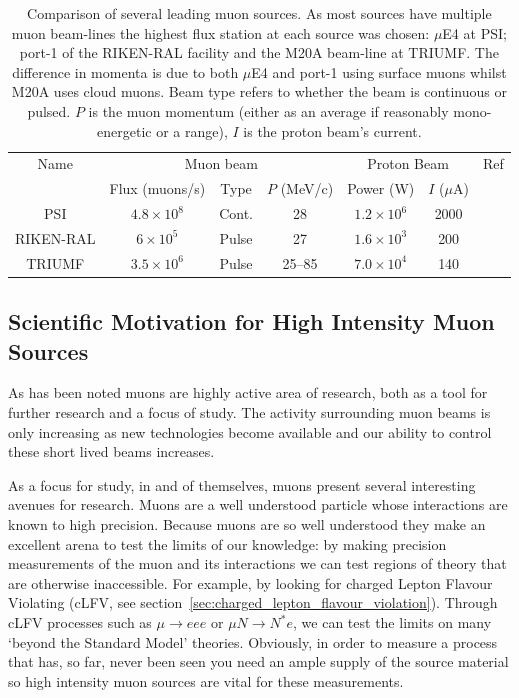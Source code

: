 \begin{table}[htpb]
  \begin{center}
  \begin{tabular}{c | c | c | c | c | c | c}
    Name       &  \multicolumn{3}{c|}{Muon beam}                  &  \multicolumn{2}{c|}{Proton Beam}  &   Ref        \\
               &  Flux (muons/s)     &  Type   & \( P \) (MeV/c)  &  Power (W)    & \(I\) (\(\mu\)A)   &              \\
    \hline    
    PSI        &  \(4.8\times10^8\)  &  Cont.  &  28              &  \(1.2\times10^6\)  &  2000  &  \cite{mue4_psi}    \\ 
    RIKEN-RAL  &  \(6\times10^5\)    &  Pulse  &  27              &  \(1.6\times10^3\)  &  200   &  \cite{riken_ral}   \\
    TRIUMF     &  \(3.5\times10^6\)  &  Pulse  &  25--85          &  \(7.0\times10^4\)  &  140   &  \cite{triumf_m20a} \\
  \end{tabular}
  \end{center}
  \caption{Comparison of several leading muon sources. As most sources have multiple muon beam-lines the highest flux station at each source was chosen: \(\mu\)E4 at PSI; port-1 of the RIKEN-RAL facility and the M20A beam-line at TRIUMF. The difference in momenta is due to both \(\mu\)E4 and port-1 using surface muons whilst M20A uses cloud muons. Beam type refers to whether the beam is continuous or pulsed. \( P \) is the muon momentum (either as an average if reasonably mono-energetic or a range), \( I \) is the proton beam's current.}
  \label{tab:cf_muon_sources}
\end{table}


\subsection{Scientific Motivation for High Intensity Muon Sources} %
\label{sec:scientific_motivation_for_high_intenstity_muon_sources}
As has been noted muons are highly active area of research, both as a tool for further research and a focus of study. The activity surrounding muon beams is only increasing as new technologies become available and our ability to control these short lived beams increases. 

As a focus for study, in and of themselves, muons present several interesting avenues for research. Muons are a well understood particle whose interactions are known to high precision. Because muons are so well understood they make an excellent arena to test the limits of our knowledge: by making precision measurements of the muon and its interactions we can test regions of theory that are otherwise inaccessible. For example, by looking for charged Lepton Flavour Violating (cLFV, see section~\ref{sec:charged_lepton_flavour_violation}). Through cLFV processes such as \( \mu\rightarrow eee \) or \( \mu N \rightarrow N^* e \), we can test the limits on many `beyond the Standard Model' theories. Obviously, in order to measure a process that has, so far, never been seen you need an ample supply of the source material so high intensity muon sources are vital for these measurements.

